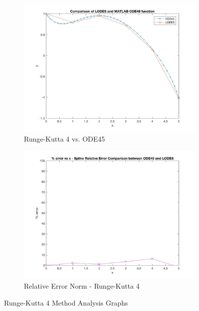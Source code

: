 \documentclass[12pt, titlepage]{article}
\begin{document}
\begin{figure}[H]
\centering
\begin{subfigure}{.55\textwidth}
  \centering
  \includegraphics[width=\linewidth]{images/Test4/4LODESvsMATLABPlot.jpg}
  \caption{Runge-Kutta 4 vs. ODE45}
  \label{fig:rk4a}
\end{subfigure}%
\begin{subfigure}{.55\textwidth}
  \centering
  \includegraphics[width=\linewidth]{images/Test4/4RelativeErrorPlot.jpg}
  \caption{Relative Error Norm - Runge-Kutta 4}
  \label{fig:rk4b}
\end{subfigure}
\caption{Runge-Kutta 4 Method Analysis Graphs}
\label{fig:rk4}
\end{figure}
\end{document}
